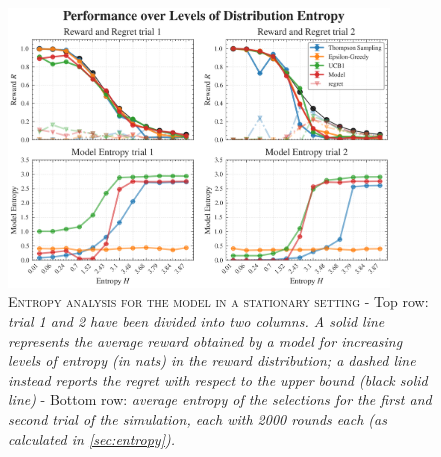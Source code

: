 \begin{figure}[H]
    \centering
    \includegraphics[width=0.9\textwidth]{figures/entropy_performance_plot.png}
    \caption{\textsc{Entropy analysis for the model in a stationary setting} - Top row: \textit{trial 1 and 2 have been divided into two columns. A solid line represents the average reward obtained by a model for increasing levels of entropy (in nats) in the reward distribution; a dashed line instead reports the regret with respect to the upper bound (black solid line) }
- Bottom row: \textit{average entropy of the selections for the first and second trial of the simulation, each with 2000 rounds each (as calculated in \ref{sec:entropy}).}}
\end{figure}\label{fig:entropy_distr}




